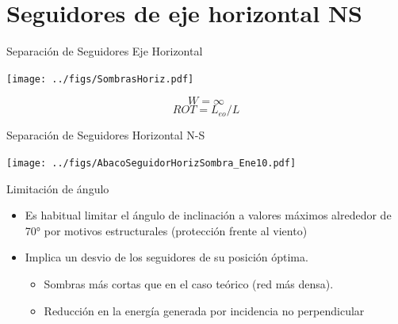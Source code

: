 \documentclass[aspectratio=169, usenames,svgnames,dvipsnames]{beamer}
\begin{document}
\section{Seguidores de eje horizontal NS}
\label{sec:org5cbae5c}

\begin{frame}[label={sec:org11f455b}]{Separación de Seguidores Eje Horizontal}
\begin{center}
\texttt{[image: ../figs/SombrasHoriz.pdf]}
\end{center}

$$W=\infty$$ $$ROT=L_{eo}/L$$
\end{frame}

\begin{frame}[label={sec:org97730d5}]{Separación de Seguidores Horizontal N-S}
\begin{center}
\texttt{[image: ../figs/AbacoSeguidorHorizSombra\_Ene10.pdf]}
\end{center}
\end{frame}

\begin{frame}[label={sec:org8de9cc4}]{Limitación de ángulo}
\begin{itemize}
\item Es habitual limitar el ángulo de inclinación a valores máximos alrededor de 70° por motivos estructurales (protección frente al viento)

\item Implica un desvio de los seguidores de su posición óptima.

\begin{itemize}
\item Sombras más cortas que en el caso teórico (red más densa).

\item Reducción en la energía generada por incidencia no perpendicular
\end{itemize}
\end{itemize}
\end{frame}
\end{document}
